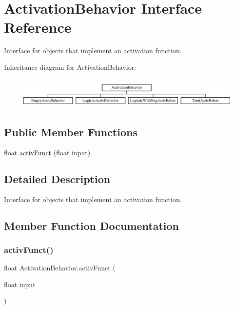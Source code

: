 \hypertarget{interface_activation_behavior}{}\section{Activation\+Behavior Interface Reference}
\label{interface_activation_behavior}


Interface for objects that implement an activation function.  


Inheritance diagram for Activation\+Behavior\+:\begin{figure}[H]
\begin{center}
\leavevmode
\includegraphics[height=1.600000cm]{interface_activation_behavior}
\end{center}
\end{figure}
\subsection*{Public Member Functions}
\begin{DoxyCompactItemize}
\item 
float \mbox{\hyperlink{interface_activation_behavior_a6c7af51cf1b10eaadcbf086231e5539b}{activ\+Funct}} (float input)
\end{DoxyCompactItemize}


\subsection{Detailed Description}
Interface for objects that implement an activation function. 



\subsection{Member Function Documentation}
\mbox{\label{interface_activation_behavior_a6c7af51cf1b10eaadcbf086231e5539b}} 
\subsubsection{\texorpdfstring{activ\+Funct()}{activFunct()}}
{\footnotesize\ttfamily float Activation\+Behavior.\+activ\+Funct (\begin{DoxyParamCaption}\item[{float}]{input }\end{DoxyParamCaption})}




